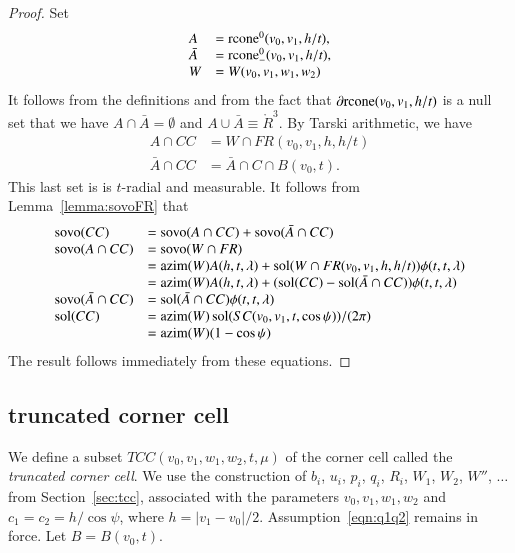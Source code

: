 \begin{proof}
Set
$$
 \begin{array}{lll}
 A &= {\operatorname{rcone}}^0(v_0,v_1,h/t),\\
  \bar A &= {\operatorname{rcone}}^0_-(v_0,v_1,h/t),\\
 W &= W(v_0,v_1,w_1,w_2)\\
 \end{array}
$$
It follows from the definitions and from the
fact that $\partial{\operatorname{rcone}}(v_0,v_1,h/t)$
is a null set that
we have $A\cap \bar A = \emptyset$ and 
$A\cup \bar A \equiv \ring{R}^3$.
By Tarski arithmetic, we have 
$$
  \begin{array}{lll}
    A\cap CC &= W \cap FR(v_0,v_1,h,h/t)\\
    \bar A \cap CC &= \bar A \cap C \cap B(v_0,t).
  \end{array}
$$
This last set is
is $t$-radial and measurable.
It follows from Lemma~\ref{lemma:sovoFR} that
$$
  \begin{array}{lll}
  {\operatorname{sovo}}(CC) &= {\operatorname{sovo}}(A\cap CC) + {\operatorname{sovo}}(\bar A\cap CC)\\
  {\operatorname{sovo}}(A\cap CC) &= {\operatorname{sovo}}(W\cap FR) \\
     &= {\operatorname{azim}}(W) A(h,t,\lambda) + \operatorname{sol}(W\cap FR(v_0,v_1,h,h/t))\phi(t,t,\lambda)\\
  &={\operatorname{azim}}(W) A(h,t,\lambda) + (\operatorname{sol}(CC)-\operatorname{sol}(\bar A \cap CC))\phi(t,t,\lambda)\\
  {\operatorname{sovo}}(\bar A \cap CC) &= \operatorname{sol}(\bar A \cap CC)\phi(t,t,\lambda)\\
  \operatorname{sol}(CC) &= {\operatorname{azim}}(W) \operatorname{sol}(SC(v_0,v_1,t,\cos\psi))/(2\pi) \\
         &={\operatorname{azim}}(W) (1-\cos\psi)\\
  \end{array}
$$
The result follows immediately from these equations.
\end{proof}

\subsection{truncated corner cell}



We define a subset $TCC(v_0,v_1,w_1,w_2,t,\mu)$ of the corner cell
called
the {\it truncated corner cell}.  
We use the construction of $b_i$, $u_i$, $p_i$, $q_i$, $R_i$,
$W_1$, $W_2$, $W''$, $\ldots$ from Section~\ref{sec:tcc},
associated with the parameters $v_0,v_1,w_1,w_2$ and
$c_1=c_2 = h/\cos\psi$, where $h = |v_1-v_0|/2$.  
Assumption~\ref{eqn:q1q2} remains
in force.  Let $B  = B(v_0,t)$.

